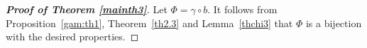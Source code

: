 \documentclass[12pt]{amsart}
\theoremstyle{plain}
\theoremstyle{definition}
\theoremstyle{example}
\theoremstyle{remark}
\numberwithin{equation}{section}
\numberwithin{figure}{section}
\begin{document}
 \begin{proof}[{\bf Proof of Theorem \ref{mainth3}}] Let $\Phi=\gamma \circ b$.  It follows from Proposition~\ref{gam:th1}, Theorem~\ref{th2.3} and Lemma~\ref{thchi3} that $\Phi$ is a bijection with the desired properties.
\end{proof}
\end{document}
